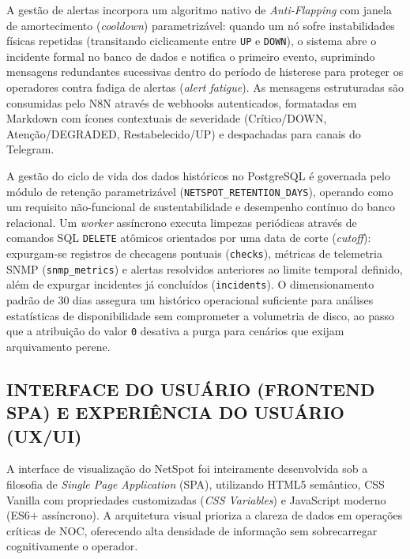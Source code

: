 \documentclass[12pt,a4paper]{article}
\begin{document}
A gestão de alertas incorpora um algoritmo nativo de \textit{Anti-Flapping} com janela de amortecimento (\textit{cooldown}) parametrizável: quando um nó sofre instabilidades físicas repetidas (transitando ciclicamente entre \texttt{UP} e \texttt{DOWN}), o sistema abre o incidente formal no banco de dados e notifica o primeiro evento, suprimindo mensagens redundantes sucessivas dentro do período de histerese para proteger os operadores contra fadiga de alertas (\textit{alert fatigue}). As mensagens estruturadas são consumidas pelo N8N através de webhooks autenticados, formatadas em Markdown com ícones contextuais de severidade (Crítico/DOWN, Atenção/DEGRADED, Restabelecido/UP) e despachadas para canais do Telegram.

A gestão do ciclo de vida dos dados históricos no PostgreSQL é governada pelo módulo de retenção parametrizável (\texttt{NETSPOT\_RETENTION\_DAYS}), operando como um requisito não-funcional de sustentabilidade e desempenho contínuo do banco relacional. Um \textit{worker} assíncrono executa limpezas periódicas através de comandos SQL \texttt{DELETE} atômicos orientados por uma data de corte (\textit{cutoff}): expurgam-se registros de checagens pontuais (\texttt{checks}), métricas de telemetria SNMP (\texttt{snmp\_metrics}) e alertas resolvidos anteriores ao limite temporal definido, além de expurgar incidentes já concluídos (\texttt{incidents}). O dimensionamento padrão de 30 dias assegura um histórico operacional suficiente para análises estatísticas de disponibilidade sem comprometer a volumetria de disco, ao passo que a atribuição do valor \texttt{0} desativa a purga para cenários que exijam arquivamento perene.

\subsection{INTERFACE DO USUÁRIO (FRONTEND SPA) E EXPERIÊNCIA DO USUÁRIO (UX/UI)}
A interface de visualização do NetSpot foi inteiramente desenvolvida sob a filosofia de \textit{Single Page Application} (SPA), utilizando HTML5 semântico, CSS Vanilla com propriedades customizadas (\textit{CSS Variables}) e JavaScript moderno (ES6+ assíncrono). A arquitetura visual prioriza a clareza de dados em operações críticas de NOC, oferecendo alta densidade de informação sem sobrecarregar cognitivamente o operador.
\end{document}
